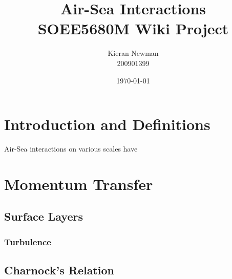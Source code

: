 \documentclass{report}
\begin{document}
  
  \title{Air-Sea Interactions\\SOEE5680M Wiki Project} 
  \author{Kieran Newman\\200901399}
  \date{\small\today}
  \maketitle
  
  \ifdefined\HCode
  \fi
  
  \tableofcontents
  
  \ifdefined\HCode
  \fi
  
  \chapter{Introduction and Definitions} 
\label{intro}
  \ifdefined\HCode
  \else
  {
  \startcontents[chapter]
  }
  \fi
    \lipsum[10]

  
   
  \ifdefined\HCode
  \fi
  
  \ifdefined\HCode
  \else
  {
  \stopcontents[chapter]
  } 
  \fi
  
 Air-Sea interactions on various scales have 
  \chapter{Momentum Transfer}
\label{momentumtransfer}
    \lipsum[10]
  
    \section{Surface Layers}
\label{surfacelayers}
    \lipsum[1-2]

   \subsection{Turbulence}
\label{momturbulence} 
    \lipsum[1-2]

    \section{Charnock's Relation}
\label{charnock}
    \lipsum[1-2]
  
\end{document}

